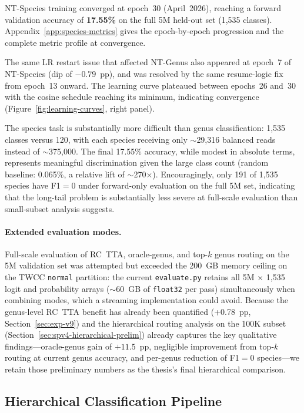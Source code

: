 NT-Species training converged at epoch~30 (April~2026), reaching a forward validation accuracy of \textbf{17.55\%} on the full 5M held-out set (1,535 classes). Appendix~\ref{app:species-metrics} gives the epoch-by-epoch progression and the complete metric profile at convergence.

The same LR restart issue that affected NT-Genus also appeared at epoch~7 of NT-Species (dip of $-0.79$~pp), and was resolved by the same resume-logic fix from epoch~13 onward. The learning curve plateaued between epochs~26 and~30 with the cosine schedule reaching its minimum, indicating convergence (Figure~\ref{fig:learning-curves}, right panel).

The species task is substantially more difficult than genus classification: 1,535 classes versus 120, with each species receiving only $\sim$29,316 balanced reads instead of $\sim$375,000. The final 17.55\% accuracy, while modest in absolute terms, represents meaningful discrimination given the large class count (random baseline: 0.065\%, a relative lift of $\sim$270$\times$). Encouragingly, only 191 of 1,535 species have F1$=$0 under forward-only evaluation on the full 5M set, indicating that the long-tail problem is substantially less severe at full-scale evaluation than small-subset analysis suggests.

\paragraph{Extended evaluation modes.}
Full-scale evaluation of RC~TTA, oracle-genus, and top-$k$ genus routing on the 5M validation set was attempted but exceeded the 200~GB memory ceiling on the TWCC \texttt{normal} partition: the current \texttt{evaluate.py} retains all 5M $\times$ 1{,}535 logit and probability arrays ($\sim$60~GB of \texttt{float32} per pass) simultaneously when combining modes, which a streaming implementation could avoid. Because the genus-level RC~TTA benefit has already been quantified (+0.78~pp, Section~\ref{sec:exp-v9}) and the hierarchical routing analysis on the 100K subset (Section~\ref{sec:spv4-hierarchical-prelim}) already captures the key qualitative findings---oracle-genus gain of $+11.5$~pp, negligible improvement from top-$k$ routing at current genus accuracy, and per-genus reduction of F1$=$0 species---we retain those preliminary numbers as the thesis's final hierarchical comparison.

\subsection{Hierarchical Classification Pipeline}

